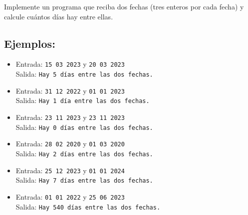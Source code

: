 Implemente un programa que reciba dos fechas (tres enteros por cada fecha) y calcule cuántos días hay entre ellas.
\subsection*{Ejemplos:}
\begin{itemize}
    \item Entrada: \texttt{15 03 2023} y \texttt{20 03 2023}\\
          Salida: \texttt{Hay 5 días entre las dos fechas.}
    \item Entrada: \texttt{31 12 2022} y \texttt{01 01 2023}\\
          Salida: \texttt{Hay 1 día entre las dos fechas.}
    \item Entrada: \texttt{23 11 2023} y \texttt{23 11 2023}\\
          Salida: \texttt{Hay 0 días entre las dos fechas.}
    \item Entrada: \texttt{28 02 2020} y \texttt{01 03 2020}\\
          Salida: \texttt{Hay 2 días entre las dos fechas.}
    \item Entrada: \texttt{25 12 2023} y \texttt{01 01 2024}\\
          Salida: \texttt{Hay 7 días entre las dos fechas.}
    \item Entrada: \texttt{01 01 2022} y \texttt{25 06 2023}\\
          Salida: \texttt{Hay 540 días entre las dos fechas.}
\end{itemize}
